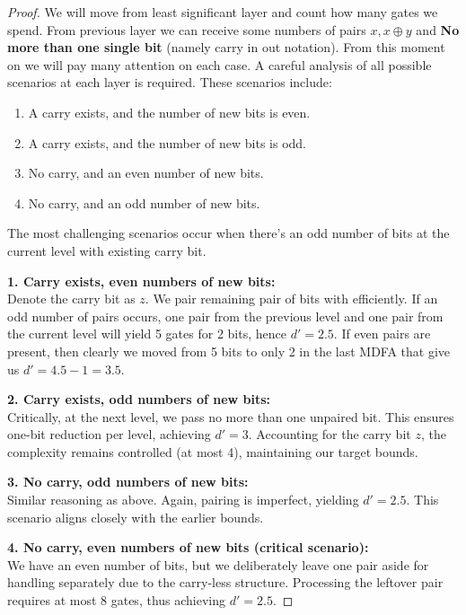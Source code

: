 \documentclass[sigconf, review, anonymous]{acmart}
\begin{document}
\begin{proof}
We will move from least significant layer and count how many gates we spend. From previous layer we can receive some numbers of pairs \(x, x \oplus y \) and \textbf{No more than one single bit} (namely carry in out notation).
From this moment on we will pay many attention on each case. A careful analysis of all possible scenarios at each layer is required. These scenarios include:
\begin{enumerate}
    \item A carry exists, and the number of new bits is even.
    \item A carry exists, and the number of new bits is odd.
    \item No carry, and an even number of new bits.
    \item No carry, and an odd number of new bits.
\end{enumerate}

The most challenging scenarios occur when there's an odd number of bits at the current level with existing carry bit.


\textbf{1. Carry exists, even numbers of new bits:}\\
Denote the carry bit as \( z \). We pair remaining pair of bits with efficiently. If an odd number of pairs occurs, one pair from the previous level and one pair from the current level will yield 5 gates for 2 bits, hence \( d' = 2.5 \). If even pairs are present, then clearly we moved from 5 bits to only 2 in the last MDFA that give us \( d' = 4.5 - 1 = 3.5 \).

\textbf{2. Carry exists, odd numbers of new bits:}\\
Critically, at the next level, we pass no more than one unpaired bit. This ensures one-bit reduction per level, achieving \( d' = 3 \). Accounting for the carry bit \( z \), the complexity remains controlled (at most 4), maintaining our target bounds.

\textbf{3. No carry, odd numbers of new bits:}\\
Similar reasoning as above. Again, pairing is imperfect, yielding \( d' = 2.5 \). This scenario aligns closely with the earlier bounds.

\textbf{4. No carry, even numbers of new bits (critical scenario):}\\
We have an even number of bits, but we deliberately leave one pair aside for handling separately due to the carry-less structure. Processing the leftover pair requires at most 8 gates, thus achieving \( d' = 2.5 \).


\end{proof}
\end{document}
